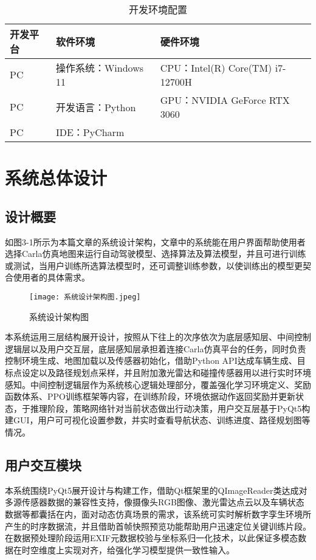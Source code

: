 \begin{table}[htbp]
	\centering
	\caption{开发环境配置}
	\label{tab:actuators}
	\begin{tabular}{lll}
		\toprule
		\textbf{开发平台} & \textbf{软件环境} & \textbf{硬件环境} \\
		\midrule
		PC   &操作系统：Windows 11   &  CPU：Intel(R) Core(TM) i7-12700H  \\
		PC &开发语言：Python       & GPU：NVIDIA GeForce RTX 3060 \\
		PC &IDE：PyCharm          &  \\
		\bottomrule
	\end{tabular}
\end{table}

\section{系统总体设计}
\subsection{设计概要}
如图3-1所示为本篇文章的系统设计架构，文章中的系统能在用户界面帮助使用者选择Carla仿真地图来运行自动驾驶模型、选择算法及算法模型，并且可进行训练或测试，当用户训练所选算法模型时，还可调整训练参数，以使训练出的模型更契合使用者的具体需求。

\begin{figure}[hbt]
	\centering
	\texttt{[image: 系统设计架构图.jpeg]}
	\caption{系统设计架构图}
	\label{f.example}
\end{figure}

本系统运用三层结构展开设计，按照从下往上的次序依次为底层感知层、中间控制逻辑层以及用户交互层，底层感知层承担着连接Carla仿真平台的任务，同时负责控制环境生成、地图加载以及传感器初始化，借助Python API达成车辆生成、目标点设定以及路径规划点采样，并且附加激光雷达和碰撞传感器用以进行实时环境感知。中间控制逻辑层作为系统核心逻辑处理部分，覆盖强化学习环境定义、奖励函数体系、PPO训练框架等内容，在训练阶段，环境依据动作返回奖励并更新状态，于推理阶段，策略网络针对当前状态做出行动决策，用户交互层基于PyQt5构建GUI，用户可可视化设置参数，并实时查看导航状态、训练进度、路径规划图等情况。

\subsection{用户交互模块}
本系统围绕PyQt5展开设计与构建工作，借助Qt框架里的QImageReader类达成对多源传感器数据的兼容性支持，像摄像头RGB图像、激光雷达点云以及车辆状态数据等都囊括在内，面对动态仿真场景的需求，该系统可实时解析数字孪生环境所产生的时序数据流，并且借助首帧快照预览功能帮助用户迅速定位关键训练片段。在数据预处理阶段运用EXIF元数据校验与坐标系归一化技术，以此保证多模态数据在时空维度上实现对齐，给强化学习模型提供一致性输入。

